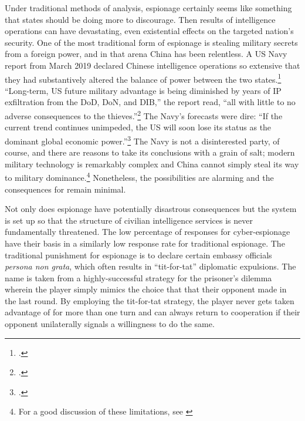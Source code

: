 \documentclass[14pt]{extarticle}
\begin{document}

Under traditional methods of analysis, espionage certainly seems like something that states should be doing more to discourage. Then results of intelligence operations can have devastating, even existential effects on the targeted nation's security. One of the most traditional form of espionage is stealing military secrets from a foreign power, and in that arena China has been relentless. A US Navy report from March 2019 declared Chinese intelligence operations so extensive that they had substantively altered the balance of power between the two states.\footcite{lubold_navy_2019} ``Long-term, US future military advantage is being diminished by years of IP exfiltration from the DoD, DoN, and DIB,'' the report read, ``all with little to no adverse consequences to the thieves.''\footcite[p.~6]{bayer_cybersecurity_2019} The Navy's forecasts were dire: ``If the current trend continues unimpeded, the US will soon lose its status as the dominant global economic power.''\footcite[p.~5]{bayer_cybersecurity_2019} The Navy is not a disinterested party, of course, and there are reasons to take its conclusions with a grain of salt; modern military technology is remarkably complex and China cannot simply steal its way to military dominance.\footnote{For a good discussion of these limitations, see \cite{gilli_why_2019}} Nonetheless, the possibilities are alarming and the consequences for remain minimal.

Not only does espionage have potentially disastrous consequences but the system is set up so that the structure of civilian intelligence services is never fundamentally threatened. The low percentage of responses for cyber-espionage have their basis in a similarly low response rate for traditional espionage. The traditional punishment for espionage is to declare certain embassy officials \emph{persona non grata}, which often results in ``tit-for-tat'' diplomatic expulsions. The name is taken from a highly-successful strategy for the prisoner's dilemma wherein the player simply mimics the choice that that their opponent made in the last round. By employing the tit-for-tat strategy, the player never gets taken advantage of for more than one turn and can always return to cooperation if their opponent unilaterally signals a willingness to do the same.
\end{document}
